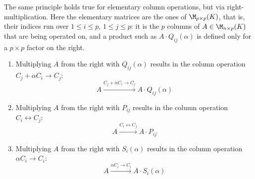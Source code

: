 \begin{importantremark}
\label{rem:column_operations}
The same principle holds true for elementary column operations, but via right-multiplication.
Here the elementary matrices are the ones of $\M_{p \times p}(K)$, that is, their indices run over $1 \le i \le p$, $1 \le j \le p$: it is the $p$ columns of $A \in \M_{n \times p}(K)$ that are being operated on, and a product such as $A \cdot Q_{ij}(\alpha)$ is defined only for a $p \times p$ factor on the right.
\begin{enumerate}[label=\textbf{(\alph*')}]
    \item Multiplying $A$ from the right with $Q_{ij}(\alpha)$ results in the column operation $C_j + \alpha C_i \longrightarrow C_j$:
    \begin{equation*}
        A \xrightarrow{C_j + \alpha C_i \longrightarrow C_j} A \cdot Q_{ij}(\alpha)
    \end{equation*}
    \item Multiplying $A$ from the right with $P_{ij}$ results in the column operation $C_i \leftrightarrow C_j$:
    \begin{equation*}
        A \xrightarrow{C_i \leftrightarrow C_j} A \cdot P_{ij}
    \end{equation*}
    \item Multiplying $A$ from the right with $S_i(\alpha)$ results in the column operation $\alpha C_i \longrightarrow C_i$:
    \begin{equation*}
        A \xrightarrow{\alpha C_i \longrightarrow C_i} A \cdot S_i(\alpha)
    \end{equation*}
\end{enumerate}
\end{importantremark}

